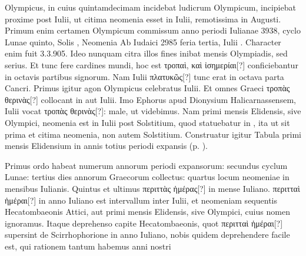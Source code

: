 Olympicus, in cuius quintamdecimam incidebat ludicrum Olympicum,
incipiebat proxime post  Iulii, ut citima neomenia esset
 in 
Iulii, remotissima in  Augusti.
Primum enim certamen Olympicum
commissum anno periodi Iulianae 3938, cyclo Lunae quinto, Solis ,
Neomenia Ab Iudaici 2985 feria tertia, Iulii .
Character enim fuit
3.3.905.
Ideo nunquam citra illos fines inibat mensis Olympiadis, sed
serius.
Et tunc fere cardines mundi, hoc est
 \textgreek{τροπαὶ, καὶ ἰσημερίαι[?]} conficiebantur
in octavis partibus signorum.
Nam  Iulii \textgreek{πλατυκῶς[?]} tunc
erat in octava parta Cancri.
Primus igitur agon Olympicus celebratus
 Iulii.
Et omnes Graeci \textgreek{τροπὰς θερινὰς[?]} collocant in
  aut 
Iulii.
Imo Ephorus apud Dionysium Halicarnassensem,  Iulii vocat
\textgreek{τροπὰς θερινὰς[?]}: male, ut videbimus.
Nam primi mensis Elidensis, sive
Olympici, neomenia est in  Iulii post Solstitium, quod statuebatur
in , ita ut  sit prima et citima neomenia,
 non autem Solstitium.
%
Construatur igitur Tabula primi mensis Elidensium
 in annis totius periodi
expansis (p. \pageref{tab:p038}).
\begin{table}[htbp]
 
\end{table}
%
Primus ordo habeat numerum annorum periodi expansorum:
secundus cyclum Lunae: tertius dies annorum Graecorum collectus:
quartus locum neomeniae in mensibus Iulianis.
%
Quintus et ultimus
\textgreek{περιττὰς ἡμέρας[?]} in mense Iuliano.
\textgreek{περιτταὶ ἡμέραι[?]} in anno Iuliano
est intervallum inter  Iulii,
 et neomeniam sequentis Hecatombaeonis
Attici, aut primi mensis Elidensis, sive Olympici, cuius nomen
ignoramus.
Itaque deprehenso capite Hecatombaeonis, quot
\textgreek{περιτταὶ ἡμέραι[?]} supersint de Scirrhophorione in anno Iuliano,
 nobis quidem
deprehendere facile est, qui rationem tantum habemus anni nostri
